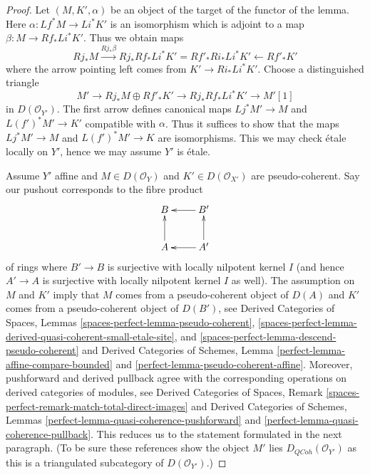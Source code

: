 \documentclass{stacks-project}
\theoremstyle{plain}
\theoremstyle{definition}
\theoremstyle{remark}
\numberwithin{equation}{subsection}
\def\QCoh{\mathit{QCoh}}
\begin{document}
\begin{proof}
Let $(M, K', \alpha)$ be an object of the target of the functor
of the lemma. Here $\alpha : Lf^*M \to Li^*K'$
is an isomorphism which is adjoint to a map $\beta : M \to Rf_*Li^*K'$.
Thus we obtain maps
$$
Rj_*M \xrightarrow{Rj_*\beta}
Rj_*Rf_*Li^*K' = Rf'_*Ri_*Li^*K' \leftarrow Rf'_*K'
$$
where the arrow pointing left comes from $K' \to Ri_*Li^*K'$.
Choose a distinguished triangle
$$
M' \to Rj_*M \oplus Rf'_*K' \to Rj_*Rf_*Li^*K' \to M'[1]
$$
in $D(\mathcal{O}_{Y'})$. The first arrow defines canonical maps
$Lj^*M' \to M$ and $L(f')^*M' \to K'$ compatible with $\alpha$.
Thus it suffices to show that the maps
$Lj^*M' \to M$ and $L(f')^*M' \to K$ are isomorphisms.
This we may check \'etale locally on $Y'$, hence we may
assume $Y'$ is \'etale.

\medskip\noindent
Assume $Y'$ affine and $M \in D(\mathcal{O}_Y)$
and $K' \in D(\mathcal{O}_{X'})$ are pseudo-coherent.
Say our pushout corresponds to the fibre product
$$
\xymatrix{
B & B' \ar[l] \\
A \ar[u] & A' \ar[l] \ar[u]
}
$$
of rings where $B' \to B$ is surjective with locally nilpotent kernel $I$
(and hence $A' \to A$ is surjective with locally nilpotent kernel $I$ as well).
The assumption on $M$ and $K'$ imply that $M$ comes from a pseudo-coherent
object of $D(A)$ and $K'$ comes from a pseudo-coherent object of $D(B')$, see
Derived Categories of Spaces, Lemmas
\ref{spaces-perfect-lemma-pseudo-coherent},
\ref{spaces-perfect-lemma-derived-quasi-coherent-small-etale-site}, and
\ref{spaces-perfect-lemma-descend-pseudo-coherent}
and
Derived Categories of Schemes, Lemma
\ref{perfect-lemma-affine-compare-bounded} and
\ref{perfect-lemma-pseudo-coherent-affine}.
Moreover, pushforward and derived pullback agree with the
corresponding operations on derived categories of modules, see
Derived Categories of Spaces, Remark
\ref{spaces-perfect-remark-match-total-direct-images}
and
Derived Categories of Schemes, Lemmas
\ref{perfect-lemma-quasi-coherence-pushforward} and
\ref{perfect-lemma-quasi-coherence-pullback}.
This reduces us to the statement formulated in the next paragraph.
(To be sure these references show
the object $M'$ lies $D_\QCoh(\mathcal{O}_{Y'})$
as this is a triangulated subcategory of $D(\mathcal{O}_{Y'})$.)


\end{proof}
\end{document}
